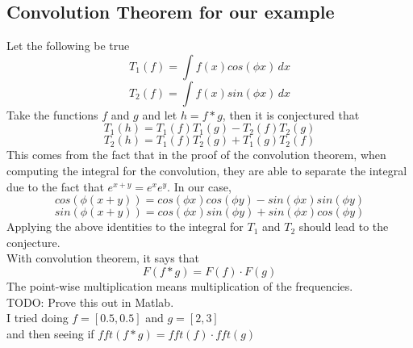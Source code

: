 \documentclass[11pt,psfig]{article}
\begin{document}
\setlength{\parskip}{1.2ex plus0.3ex minus 0.3ex}

\subsection*{Convolution Theorem for our example}

Let the following be true
\[
T_1(f) = \int{f(x) cos(\phi x) \,dx}
\]
\[
T_2(f) = \int{f(x) sin(\phi x) \,dx}
\]
Take the functions $f$ and $g$ and let $h = f*g$, then it is conjectured that
\[
T_1(h) = T_1(f) T_1(g) - T_2(f)T_2(g)
\]
\[
T_2(h) = T_1(f) T_2(g) + T_1(g)T_2(f)
\]
This comes from the fact that in the proof of the convolution theorem, when computing the integral for the convolution, they are able to separate the integral due to the fact that $e^{x+y} = e^x  e^y$. In our case,
\[
cos( \phi(x+y) ) = cos(\phi x)cos(\phi y) - sin(\phi x)sin(\phi y)
\]
\[
sin( \phi(x+y) ) = cos(\phi x)sin(\phi y) + sin(\phi x)cos(\phi y)
\]
Applying the above identities to the integral for $T_1$ and $T_2$ should lead to the conjecture. 
\\
With convolution theorem, it says that
\[
F(f*g) = F(f) \cdot F(g)
\]
The point-wise multiplication means multiplication of the frequencies. \\
TODO: Prove this out in Matlab. \\I tried doing $f = [0.5,0.5]$ and $g = [2,3]$ \\and then seeing if $fft(f*g) = fft(f) \cdot fft(g)$
\end{document}
